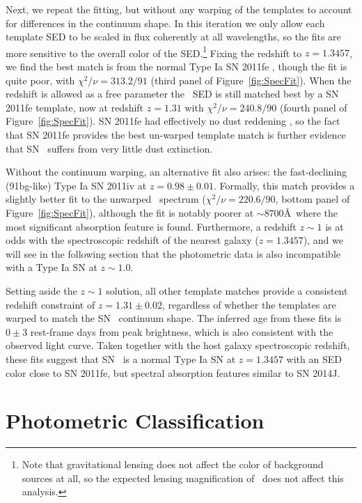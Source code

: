 Next, we repeat the fitting, but without any warping of the templates
to account for differences in the continuum shape.  In this iteration
we only allow each template SED to be scaled in flux coherently at all
wavelengths, so the fits are more sensitive to the overall color of
the SED.\footnote{Note that gravitational lensing does not affect the color of background sources at all, so the expected lensing magnification of \tomas\ does not affect this analysis.}  Fixing the redshift to $z=1.3457$, we find the best match is
from the normal Type Ia SN 2011fe \citep{Mazzali:2014}, though the fit is quite poor, with
$\chi^2/\nu=313.2/91$ (third panel of Figure~\ref{fig:SpecFit}).  When
the redshift is allowed as a free parameter the \tomas\ SED is still
matched best by a SN 2011fe template, now at redshift $z=1.31$ with
$\chi^2/\nu=240.8/90$ (fourth panel of Figure~\ref{fig:SpecFit}).  
SN 2011fe had effectively no dust reddening \citep[e.g.][]{Nugent:2011,Li:2011c}, so the fact that SN 2011fe provides the best un-warped template match is further evidence that SN \tomas\ suffers from very little dust extinction.

Without the continuum warping, an alternative fit also arises: the
fast-declining (91bg-like) Type Ia SN 2011iv \citep{Foley:2012b} at
$z=0.98\pm0.01$. Formally, this match provides a slightly better fit
to the unwarped \tomas\ spectrum ($\chi^2/\nu=220.6/90$,
bottom panel of Figure~\ref{fig:SpecFit}), although the fit is
notably poorer at $\sim8700$\AA\ where the most significant absorption
feature is found. Furthermore, a redshift $z\sim1$ is at odds with the
spectroscopic redshift of the nearest galaxy ($z=1.3457$), and we will
see in the following section that the photometric data is also
incompatible with a Type Ia SN at $z\sim1.0$.

Setting aside the $z\sim1$ solution, all other template matches
provide a consistent redshift constraint of $z=1.31\pm0.02$,
regardless of whether the templates are warped to match the SN \tomas\
continuum shape.  The inferred age from these fits is $0\pm3$
rest-frame days from peak brightness, which is also consistent with
the observed light curve.  Taken together with the host galaxy
spectroscopic redshift, these fits suggest that SN \tomas\ is a normal
Type Ia SN at $z=1.3457$ with an SED color close to SN 2011fe, but
spectral absorption features similar to SN 2014J.


\section{Photometric Classification}
\label{sec:PhotometricClassification}

